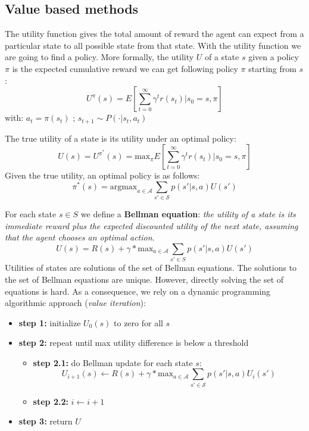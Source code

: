 \subsection{Value based methods}
The utility function gives the total amount of reward the agent can expect from a
particular state to all possible state from that state. With the utility
function we are going to find a policy. More formally, the utility $U$ of a
state $s$ given a policy $\pi$ is the expected cumulative reward we can get
following policy $\pi$ starting from $s$:
\begin{equation}
	U^{\pi}(s) = E[\sum_{t=0}^{\infty}\gamma^{t} r(s_{t}) | s_{0} = s, \pi]
\end{equation}
with: $a_{t} = \pi(s_{t})$ ; $s_{t+1}\sim P(\cdot | s_{t}, a_{t})$
\newline

The true utility of a state is its utility under an optimal policy:
\begin{equation}
	U(s) = U^{\pi^{*}}(s) = \text{max}_{\pi}E[\sum_{t=0}^{\infty}\gamma^{t} r(s_{t}
	) | s_{0} = s, \pi]
\end{equation}
Given the true utility, an optimal policy is as follows:
\begin{equation}
	\pi^{*}(s) = \text{argmax}_{a \in \mathcal{A}}\sum_{s' \in \mathcal{S}}p(s' | s
	, a) U(s')
\end{equation}

For each state $s \in S$ we define a \textbf{Bellman equation}: \textit{the
utility of a state is its immediate reward plus the expected discounted utility
of the next state, assuming that the agent chooses an optimal action}.
\begin{equation}
	U(s) = R(s) + \gamma * \text{max}_{a \in \mathcal{A}}\sum_{s' \in S}p(s' | s,a)
	U(s')
\end{equation}
Utilities of states are solutions of the set of Bellman equations. The solutions
to the set of Bellman equations are unique. However, directly solving the set of
equations is hard. As a consequence, we rely on a dynamic programming
algorithmic approach (\textit{value iteration}):
\begin{itemize}
	\item \textbf{step 1:} initialize $U_{0}(s)$ to zero for all $s$

	\item \textbf{step 2:} repeat until max utility difference is below a
		threshold
		\begin{itemize}
			\item \textbf{step 2.1:} do Bellman update for each state $s$:
				\[
					U_{i+1}(s) \leftarrow R(s) + \gamma * \text{max}_{a \in \mathcal{A}}\sum
					_{s' \in \mathcal{S}}p(s'|s,a)U_{i}(s')
				\]

			\item \textbf{step 2.2:} $i \leftarrow i+1$
		\end{itemize}

	\item \textbf{step 3:} return $U$
\end{itemize}


